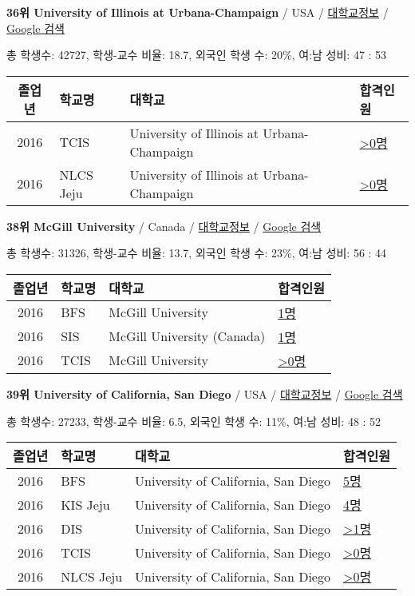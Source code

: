 \documentclass[13pt,]{article}
\begin{document}
\textbf{36위 University of Illinois at Urbana-Champaign} / USA /
\href{https://www.timeshighereducation.com/world-university-rankings/university-of-illinois-at-urbana-champaign?ranking-dataset=133819}{대학교정보}
/
\href{http://www.google.com/search?q=University+of+Illinois+at+Urbana-Champaign}{Google
검색}

총 학생수: 42727, 학생-교수 비율: 18.7, 외국인 학생 수: 20\%, 여:남
성비: 47 : 53

\begin{longtable}[]{@{}clll@{}}
\toprule
졸업년 & 학교명 & 대학교 & 합격인원\tabularnewline
\midrule
\endhead
2016 & TCIS & University of Illinois at Urbana-Champaign &
\href{http://cafe.naver.com/assarabia/11598}{\textgreater{}0명}\tabularnewline
2016 & NLCS Jeju & University of Illinois at Urbana-Champaign &
\href{http://cafe.naver.com/assarabia/11592}{\textgreater{}0명}\tabularnewline
\bottomrule
\end{longtable}

\textbf{38위 McGill University} / Canada /
\href{https://www.timeshighereducation.com/world-university-rankings/mcgill-university?ranking-dataset=133819}{대학교정보}
/ \href{http://www.google.com/search?q=McGill+University}{Google 검색}

총 학생수: 31326, 학생-교수 비율: 13.7, 외국인 학생 수: 23\%, 여:남
성비: 56 : 44

\begin{longtable}[]{@{}clll@{}}
\toprule
졸업년 & 학교명 & 대학교 & 합격인원\tabularnewline
\midrule
\endhead
2016 & BFS & McGill University &
\href{http://cafe.naver.com/assarabia/11597}{1명}\tabularnewline
2016 & SIS & McGill University (Canada) &
\href{http://cafe.naver.com/assarabia/11589}{1명}\tabularnewline
2016 & TCIS & McGill University &
\href{http://cafe.naver.com/assarabia/11598}{\textgreater{}0명}\tabularnewline
\bottomrule
\end{longtable}

\textbf{39위 University of California, San Diego} / USA /
\href{https://www.timeshighereducation.com/world-university-rankings/university-of-california-san-diego?ranking-dataset=133819}{대학교정보}
/
\href{http://www.google.com/search?q=University+of+California,+San+Diego}{Google
검색}

총 학생수: 27233, 학생-교수 비율: 6.5, 외국인 학생 수: 11\%, 여:남 성비:
48 : 52

\begin{longtable}[]{@{}clll@{}}
\toprule
졸업년 & 학교명 & 대학교 & 합격인원\tabularnewline
\midrule
\endhead
2016 & BFS & University of California, San Diego &
\href{http://cafe.naver.com/assarabia/11597}{5명}\tabularnewline
2016 & KIS Jeju & University of California, San Diego &
\href{http://cafe.naver.com/assarabia/11596}{4명}\tabularnewline
2016 & DIS & University of California, San Diego &
\href{http://cafe.naver.com/assarabia/11591}{\textgreater{}1명}\tabularnewline
2016 & TCIS & University of California, San Diego &
\href{http://cafe.naver.com/assarabia/11598}{\textgreater{}0명}\tabularnewline
2016 & NLCS Jeju & University of California, San Diego &
\href{http://cafe.naver.com/assarabia/11592}{\textgreater{}0명}\tabularnewline
\bottomrule
\end{longtable}
\end{document}
